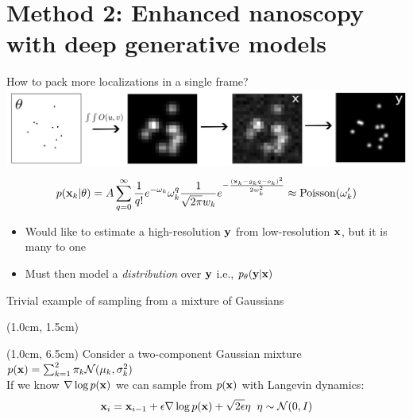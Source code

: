 \documentclass{beamer}					%
\begin{document}
\section{Method 2: Enhanced nanoscopy with deep generative models}

\begin{frame}{How to pack more localizations in a single frame?}
\includegraphics[width=\textwidth]{media/Generation.png}\\
\begin{equation*}
p(\bold{x}_{k}|\theta) = A\sum_{q=0}^{\infty} \frac{1}{q!}e^{-\omega_{k}}\omega_{k}^{q}\frac{1}{\sqrt{2\pi}w_{k}}e^{-\frac{(\bold{x}_{k}-g_{k}q-o_{k})^2}{2 w_{k}^{2}}} \approx \mathrm{Poisson}(\omega_{k}')
\end{equation*}
\begin{itemize}
\item Would like to estimate a high-resolution $\bold{y}$ from low-resolution $\bold{x}$, but it is many to one
\item Must then model a \emph{distribution} over $\bold{y}$ i.e., $p_{\theta}(\bold{y}|\bold{x})$
\end{itemize}
\end{frame}

\begin{frame}{Trivial example of sampling from a mixture of Gaussians}
\begin{textblock*}{13cm}(1.0cm, 1.5cm)
\end{textblock*}
\begin{textblock*}{13cm}(1.0cm, 6.5cm)
Consider a two-component Gaussian mixture $p(\bold{x}) = \sum_{k=1}^{2}\pi_{k}\mathcal{N}(\mu_{k},\sigma_{k}^{2})$\\
\vspace{0.5cm}
If we know $\nabla\log p(\bold{x})$ we can sample from $p(\bold{x})$ with Langevin dynamics: 
\begin{equation*}
\bold{x}_{i} = \bold{x}_{i-1} + \epsilon \nabla\log p(\bold{x}) + \sqrt{2\epsilon}\eta \;\; \eta\sim \mathcal{N}(0,I)
\end{equation*}
\end{textblock*}
\end{frame}
\end{document}
